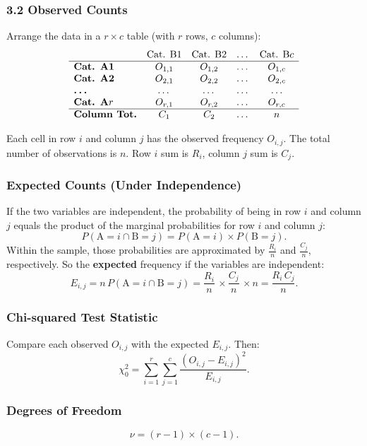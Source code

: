 \documentclass[10pt]{extarticle}
\begin{document}
\subsubsection{3.2 Observed Counts}

Arrange the data in a $r \times c$ table (with $r$ rows, $c$ columns):
\[
\begin{array}{lcccc}
 & \text{Cat. B1} & \text{Cat. B2} & \dots & \text{Cat. B}c \\
\hline
\textbf{Cat. A1} & O_{1,1} & O_{1,2} & \dots & O_{1,c} \\
\textbf{Cat. A2} & O_{2,1} & O_{2,2} & \dots & O_{2,c} \\
\textbf{\dots} & \dots & \dots & \dots & \dots \\
\textbf{Cat. A}r & O_{r,1} & O_{r,2} & \dots & O_{r,c} \\
\hline
\textbf{Column Tot.} & C_1 & C_2 & \dots & n \\
\end{array}
\]

Each cell in row $i$ and column $j$ has the observed frequency $O_{i,j}$. The total number of observations is $n$. Row $i$ sum is $R_i$, column $j$ sum is $C_j$.

\subsubsection{Expected Counts (Under Independence)}

If the two variables are independent, the probability of being in row $i$ and column $j$ equals the product of the marginal probabilities for row $i$ and column $j$:
$$
P(\text{A}=i \cap \text{B}=j) 
= P(\text{A}=i)\times P(\text{B}=j).
$$
Within the sample, those probabilities are approximated by $\frac{R_i}{n}$ and $\frac{C_j}{n}$, respectively. So the \textbf{expected} frequency if the variables are independent:
$$
E_{i,j}
= n\,P(\text{A}=i \cap \text{B}=j)
= \frac{R_i}{n}\,\times \frac{C_j}{n}\,\times n
= \frac{R_i \, C_j}{n}.
$$

\subsubsection{Chi-squared Test Statistic}

Compare each observed $O_{i,j}$ with the expected $E_{i,j}$. Then:
$$
\chi^2_0 
= \sum_{i=1}^{r} \sum_{j=1}^{c} \frac{(O_{i,j} - E_{i,j})^2}{E_{i,j}}.
$$

\subsubsection{Degrees of Freedom}
$$
\nu = (r - 1)\times(c - 1).
$$
\end{document}
